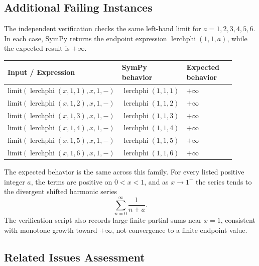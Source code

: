 \documentclass[11pt]{article}
\begin{document}
\subsection{Additional Failing Instances}

The independent verification checks the same left-hand limit for \(a=1,2,3,4,5,6\). In each case, SymPy returns the endpoint expression \(\operatorname{lerchphi}(1,1,a)\), while the expected result is \(+\infty\).

\begin{center}
\renewcommand{\arraystretch}{1.3}
\begin{tabular}{@{}>{\raggedright\arraybackslash}p{0.41\linewidth}>{\raggedright\arraybackslash}p{0.26\linewidth}>{\raggedright\arraybackslash}p{0.23\linewidth}@{}}
\toprule
\textbf{Input / Expression} & \textbf{SymPy behavior} & \textbf{Expected behavior} \\
\midrule
\(\mathrm{limit}(\operatorname{lerchphi}(x,1,1), x, 1, -)\) & \(\operatorname{lerchphi}(1,1,1)\) & \(+\infty\) \\
\(\mathrm{limit}(\operatorname{lerchphi}(x,1,2), x, 1, -)\) & \(\operatorname{lerchphi}(1,1,2)\) & \(+\infty\) \\
\(\mathrm{limit}(\operatorname{lerchphi}(x,1,3), x, 1, -)\) & \(\operatorname{lerchphi}(1,1,3)\) & \(+\infty\) \\
\(\mathrm{limit}(\operatorname{lerchphi}(x,1,4), x, 1, -)\) & \(\operatorname{lerchphi}(1,1,4)\) & \(+\infty\) \\
\(\mathrm{limit}(\operatorname{lerchphi}(x,1,5), x, 1, -)\) & \(\operatorname{lerchphi}(1,1,5)\) & \(+\infty\) \\
\(\mathrm{limit}(\operatorname{lerchphi}(x,1,6), x, 1, -)\) & \(\operatorname{lerchphi}(1,1,6)\) & \(+\infty\) \\
\bottomrule
\end{tabular}
\end{center}

The expected behavior is the same across this family. For every listed positive integer \(a\), the terms are positive on \(0<x<1\), and as \(x\to 1^-\) the series tends to the divergent shifted harmonic series
\[
\sum_{n=0}^{\infty}\frac{1}{n+a}.
\]
The verification script also records large finite partial sums near \(x=1\), consistent with monotone growth toward \(+\infty\), not convergence to a finite endpoint value.

\subsection{Related Issues Assessment}
\end{document}

